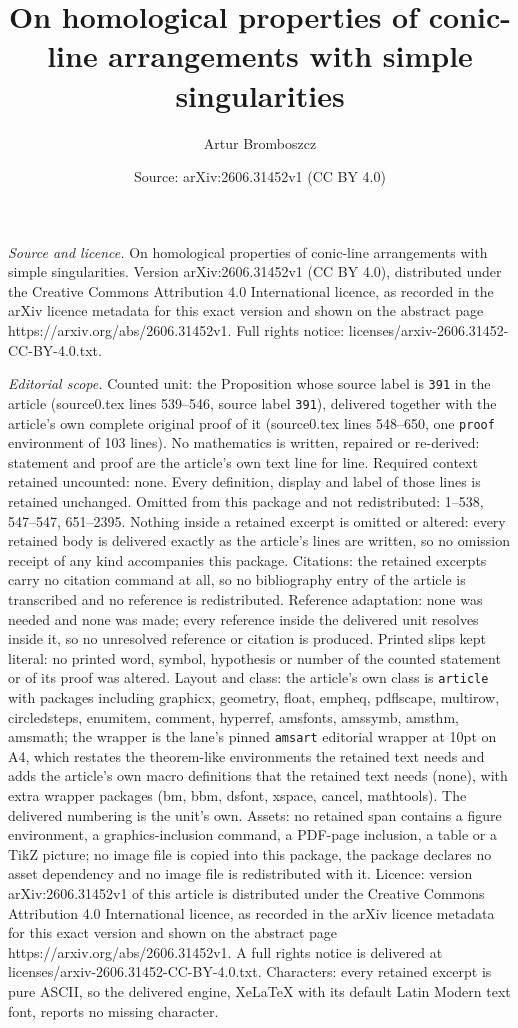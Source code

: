 \documentclass[10pt,a4paper]{amsart}
\title[On homological properties of conic-line arrangements with si]{On homological properties of conic-line arrangements with simple singularities}
\author{Artur Bromboszcz}
\date{Source: arXiv:2606.31452v1 (CC BY 4.0)}
\begin{document}
\maketitle

\noindent\emph{Source and licence.} On homological properties of conic-line arrangements with simple singularities. Version arXiv:2606.31452v1 (CC BY 4.0), distributed under the Creative Commons Attribution 4.0 International licence, as recorded in the arXiv licence metadata for this exact version and shown on the abstract page https://arxiv.org/abs/2606.31452v1. Full rights notice: licenses/arxiv-2606.31452-CC-BY-4.0.txt.\par\smallskip

\noindent\textit{Editorial scope.} Counted unit: the Proposition whose source label is \texttt{391} in the article (source0.tex lines 539--546, source label \texttt{391}), delivered together with the article's own complete original proof of it (source0.tex lines 548--650, one \texttt{proof} environment of 103 lines). No mathematics is written, repaired or re-derived: statement and proof are the article's own text line for line. Required context retained uncounted: none. Every definition, display and label of those lines is retained unchanged. Omitted from this package and not redistributed: 1--538, 547--547, 651--2395. Nothing inside a retained excerpt is omitted or altered: every retained body is delivered exactly as the article's lines are written, so no omission receipt of any kind accompanies this package. Citations: the retained excerpts carry no citation command at all, so no bibliography entry of the article is transcribed and no reference is redistributed. Reference adaptation: none was needed and none was made; every reference inside the delivered unit resolves inside it, so no unresolved reference or citation is produced. Printed slips kept literal: no printed word, symbol, hypothesis or number of the counted statement or of its proof was altered. Layout and class: the article's own class is \texttt{article} with packages including graphicx, geometry, float, empheq, pdflscape, multirow, circledsteps, enumitem, comment, hyperref, amsfonts, amssymb, amsthm, amsmath; the wrapper is the lane's pinned \texttt{amsart} editorial wrapper at 10pt on A4, which restates the theorem-like environments the retained text needs and adds the article's own macro definitions that the retained text needs (none), with extra wrapper packages (bm, bbm, dsfont, xspace, cancel, mathtools). The delivered numbering is the unit's own. Assets: no retained span contains a figure environment, a graphics-inclusion command, a PDF-page inclusion, a table or a TikZ picture; no image file is copied into this package, the package declares no asset dependency and no image file is redistributed with it. Licence: version arXiv:2606.31452v1 of this article is distributed under the Creative Commons Attribution 4.0 International licence, as recorded in the arXiv licence metadata for this exact version and shown on the abstract page https://arxiv.org/abs/2606.31452v1. A full rights notice is delivered at licenses/arxiv-2606.31452-CC-BY-4.0.txt. Characters: every retained excerpt is pure ASCII, so the delivered engine, XeLaTeX with its default Latin Modern text font, reports no missing character.
\end{document}

